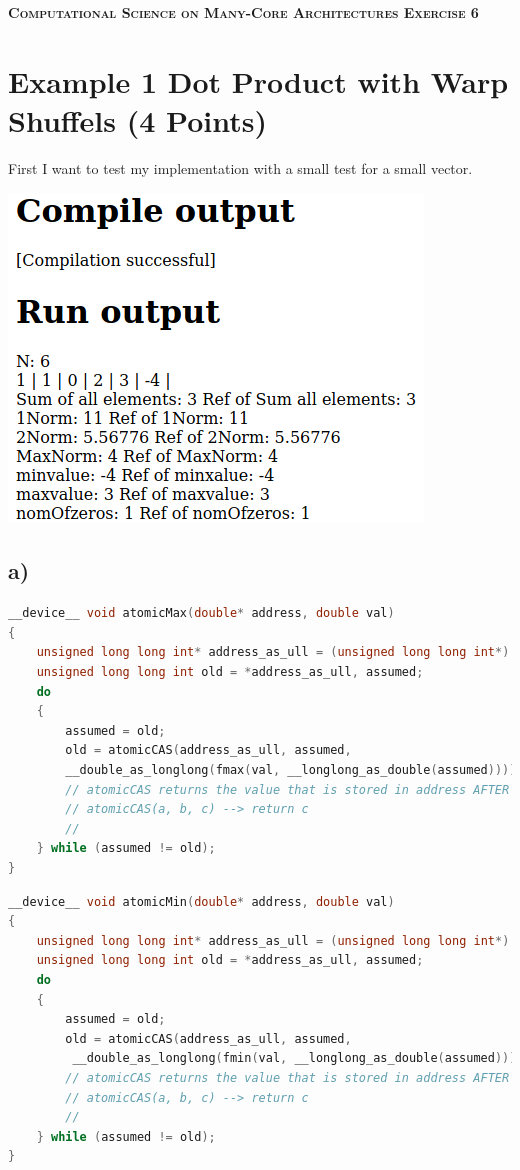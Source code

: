 \documentclass[11pt,a4paper]{article}
\begin{document}
\begin{center}
	\fontsize{24pt}{10pt}\selectfont
	\textsc{\textbf{Computational Science on Many-Core Architectures  Exercise 6}}
\end{center}
\section*{Example 1 Dot Product with Warp Shuffels (4 Points)}
First I want to test my implementation with a small test for a small vector.
\begin{center}
	
	\begin{minipage}[t]{0.40\textwidth}
		\includegraphics[width=\textwidth]{Bilder/Ex6_1}
	\end{minipage}
	
\end{center}
\subsection*{a)}
\begin{lstlisting}[language=C++, caption={additional atomicMax}]
__device__ void atomicMax(double* address, double val)
{    
	unsigned long long int* address_as_ull = (unsigned long long int*) address; 
	unsigned long long int old = *address_as_ull, assumed;
	do  
	{
		assumed = old;
		old = atomicCAS(address_as_ull, assumed, 
		__double_as_longlong(fmax(val, __longlong_as_double(assumed))));
		// atomicCAS returns the value that is stored in address AFTER the CAS
		// atomicCAS(a, b, c) --> return c
		//
	} while (assumed != old);
}
\end{lstlisting}
\begin{lstlisting}[language=C++, caption={additional atomicMin}]
 __device__ void atomicMin(double* address, double val)
{    
	unsigned long long int* address_as_ull = (unsigned long long int*) address; 
	unsigned long long int old = *address_as_ull, assumed;
	do  
	{
		assumed = old;
		old = atomicCAS(address_as_ull, assumed,
		 __double_as_longlong(fmin(val, __longlong_as_double(assumed))));
		// atomicCAS returns the value that is stored in address AFTER the CAS
		// atomicCAS(a, b, c) --> return c
		//
	} while (assumed != old);
}
\end{lstlisting}
\end{document}
